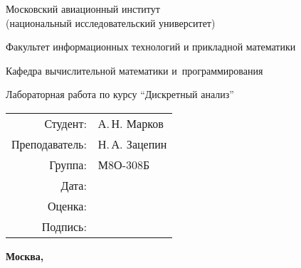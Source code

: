 \documentclass[12pt]{article}
\begin{document}
\thispagestyle{empty}
\begin{center}
    {\Large Московский авиационный институт\\ (национальный исследовательский университет)}

    \vspace{48pt}

    {\large Факультет информационных технологий и прикладной математики}

    \vspace{36pt}

    {\large Кафедра вычислительной математики и~программирования}

    \vspace{48pt}
    
    Лабораторная работа  по курсу \enquote{Дискретный анализ}

\end{center}
    
    \vspace{72pt}
    
    \begin{flushright}
    \begin{tabular}{rl}
    Студент: & А.\,Н. Марков \\
    Преподаватель: & Н.\,А. Зацепин \\
    Группа: & М8О-308Б \\
    Дата: & \\
    Оценка: & \\
    Подпись: & \\
    \end{tabular}
    \end{flushright}
    
    \vfill
    
    \begin{center}
    \bfseries
    Москва, \the\year
\end{center}

\newpage
\end{document}
